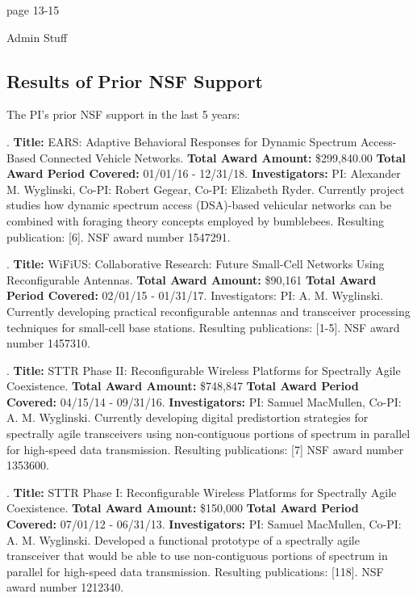 page 13-15

Admin Stuff 

\subsection{Results of Prior NSF Support}

The PI's prior NSF support in the last 5 years:

{
	.	\textbf{Title:} EARS: Adaptive Behavioral Responses for Dynamic Spectrum 
	Access-Based Connected 
	Vehicle Networks. \textbf{Total Award Amount:} \$299,840.00 \textbf{Total Award Period 
		Covered:} 01/01/16 -
	12/31/18.
	\textbf{Investigators: }PI: Alexander M. Wyglinski, Co-PI: Robert Gegear, Co-PI: Elizabeth 
	Ryder. 
	Currently project studies how dynamic spectrum access (DSA)-based vehicular networks can be 
	combined with foraging theory concepts employed by bumblebees. Resulting publication: [6]. 
	NSF award number 1547291. 
	
	.	\textbf{Title:} WiFiUS: Collaborative Research: Future Small-Cell Networks 
	Using Reconfigurable 
	Antennas.
	\textbf{Total Award Amount:} \$90,161 \textbf{Total Award Period Covered:} 02/01/15 -
	01/31/17. 
	Investigators: PI: A. M. Wyglinski.
	Currently developing practical reconfigurable antennas and transceiver processing techniques 
	for small-cell base stations. Resulting publications: [1-5]. NSF award 
	number 1457310.
	
	. \textbf{Title:} STTR Phase II: Reconfigurable Wireless Platforms for Spectrally 
	Agile Coexistence.
	\textbf{Total Award Amount:} \$748,847 \textbf{Total Award Period Covered:} 04/15/14 -
	09/31/16.
	\textbf{Investigators:} PI: Samuel MacMullen, Co-PI: A. M. Wyglinski.
	Currently developing digital predistortion strategies for spectrally agile transceivers using 
	non-contiguous portions of spectrum in parallel for high-speed data transmission. Resulting 
	publications: [7] NSF award number 1353600.
	
	.	\textbf{Title:} STTR Phase I: Reconfigurable Wireless Platforms for Spectrally 
	Agile Coexistence.
	\textbf{Total Award Amount:} \$150,000 \textbf{Total Award Period Covered:} 07/01/12 - 
	06/31/13.
	\textbf{Investigators:} PI: Samuel MacMullen, Co-PI: A. M. Wyglinski.
	Developed a functional prototype of a spectrally agile transceiver that would be able to use 
	non-contiguous portions of spectrum in parallel for high-speed data transmission. Resulting 
	publications: [118]. NSF award number 1212340.
}
